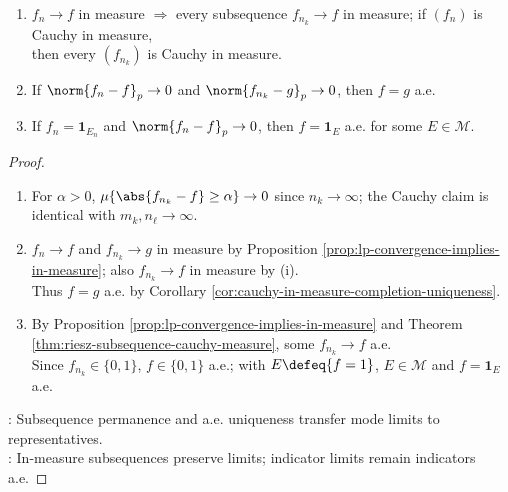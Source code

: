\begin{proposition} \label{prop:subsequence-and-indicator-exercise-consequences} 
\begin{enumerate}[label=(\roman*)]
\setlength{\itemsep}{0pt}
\item $f_n\to f$ in measure $\Rightarrow$ every subsequence $f_{n_k}\to f$ in measure; if $(f_n)$ is Cauchy in measure,\\
then every $(f_{n_k})$ is Cauchy in measure.
\item If $\norm{f_n-f}_p\to0$ and $\norm{f_{n_k}-g}_p\to0$, then $f=g$ a.e.
\item If $f_n=\mathbf{1}_{E_n}$ and $\norm{f_n-f}_p\to0$, then $f=\mathbf{1}_E$ a.e. for some $E\in\mathcal{M}$.
\end{enumerate}
\begin{proof}
\begin{enumerate}[label=(\roman*)]
\setlength{\itemsep}{0pt}
\item For $\alpha>0$, $\mu\{\abs{f_{n_k}-f}\geq\alpha\}\to0$ since $n_k\to\infty$; the Cauchy claim is identical with $m_k,n_\ell\to\infty$.
\item $f_n\to f$ and $f_{n_k}\to g$ in measure by Proposition \ref{prop:lp-convergence-implies-in-measure}; also $f_{n_k}\to f$ in measure by (i).\\
Thus $f=g$ a.e. by Corollary \ref{cor:cauchy-in-measure-completion-uniqueness}.
\item By Proposition \ref{prop:lp-convergence-implies-in-measure} and Theorem \ref{thm:riesz-subsequence-cauchy-measure}, some $f_{n_k}\to f$ a.e.\\
Since $f_{n_k}\in\{0,1\}$, $f\in\{0,1\}$ a.e.; with $E\defeq\{f=1\}$, $E\in\mathcal{M}$ and $f=\mathbf{1}_E$ a.e.
\end{enumerate}
: Subsequence permanence and a.e. uniqueness transfer mode limits to representatives.\\
: In-measure subsequences preserve limits; indicator limits remain indicators a.e.
\end{proof}
\end{proposition}

